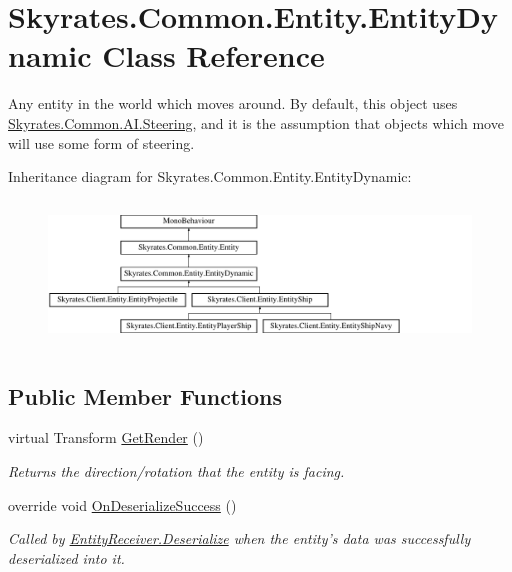 \hypertarget{class_skyrates_1_1_common_1_1_entity_1_1_entity_dynamic}{\section{Skyrates.\-Common.\-Entity.\-Entity\-Dynamic Class Reference}
\label{class_skyrates_1_1_common_1_1_entity_1_1_entity_dynamic}
}


Any entity in the world which moves around. By default, this object uses \hyperlink{class_skyrates_1_1_common_1_1_a_i_1_1_steering}{Skyrates.\-Common.\-A\-I.\-Steering}, and it is the assumption that objects which move will use some form of steering.  


Inheritance diagram for Skyrates.\-Common.\-Entity.\-Entity\-Dynamic\-:\begin{figure}[H]
\begin{center}
\leavevmode
\includegraphics[height=3.888889cm]{class_skyrates_1_1_common_1_1_entity_1_1_entity_dynamic}
\end{center}
\end{figure}
\subsection*{Public Member Functions}
\begin{DoxyCompactItemize}
\item 
virtual Transform \hyperlink{class_skyrates_1_1_common_1_1_entity_1_1_entity_dynamic_ad59c47f109bef0238b5303646a59e430}{Get\-Render} ()
\begin{DoxyCompactList}\small\item\em Returns the direction/rotation that the entity is facing. \end{DoxyCompactList}\item 
\hypertarget{class_skyrates_1_1_common_1_1_entity_1_1_entity_dynamic_aedeb63ce173df35eb21d75161d01028d}{override void \hyperlink{class_skyrates_1_1_common_1_1_entity_1_1_entity_dynamic_aedeb63ce173df35eb21d75161d01028d}{On\-Deserialize\-Success} ()}\label{class_skyrates_1_1_common_1_1_entity_1_1_entity_dynamic_aedeb63ce173df35eb21d75161d01028d}

\begin{DoxyCompactList}\small\item\em Called by \hyperlink{class_skyrates_1_1_common_1_1_entity_1_1_entity_receiver_a9da0b7c3a8b9e1ed7d10be74ce80482b}{Entity\-Receiver.\-Deserialize} when the entity's data was successfully deserialized into it.  \end{DoxyCompactList}\end{DoxyCompactItemize}
